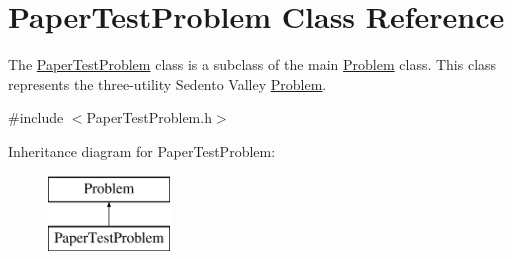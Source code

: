 \hypertarget{classPaperTestProblem}{}\section{Paper\+Test\+Problem Class Reference}
\label{classPaperTestProblem}


The {\ttfamily \mbox{\hyperlink{classPaperTestProblem}{Paper\+Test\+Problem}}} class is a subclass of the main {\ttfamily \mbox{\hyperlink{classProblem}{Problem}}} class. This class represents the three-\/utility Sedento Valley \mbox{\hyperlink{classProblem}{Problem}}.  




{\ttfamily \#include $<$Paper\+Test\+Problem.\+h$>$}

Inheritance diagram for Paper\+Test\+Problem\+:\begin{figure}[H]
\begin{center}
\leavevmode
\includegraphics[height=2.000000cm]{classPaperTestProblem}
\end{center}
\end{figure}
